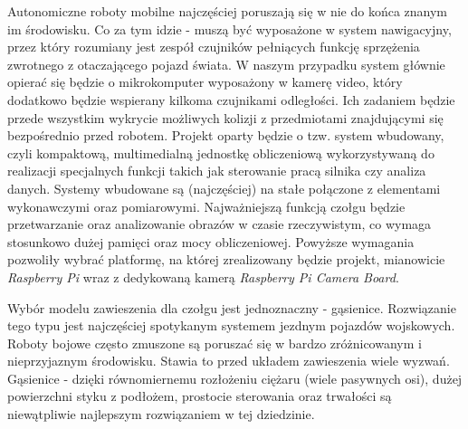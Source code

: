 Autonomiczne roboty mobilne najczęściej poruszają się w nie do końca znanym im środowisku. Co za tym idzie - muszą być wyposażone w system nawigacyjny, przez który rozumiany jest zespół czujników pełniących funkcję sprzężenia zwrotnego z otaczającego pojazd świata. W naszym przypadku system głównie opierać się będzie o mikrokomputer wyposażony w kamerę video, który dodatkowo będzie wspierany kilkoma czujnikami odległości. Ich zadaniem będzie przede wszystkim wykrycie możliwych kolizji z przedmiotami znajdującymi się bezpośrednio przed robotem. Projekt oparty będzie o tzw. system wbudowany, czyli kompaktową, multimedialną jednostkę obliczeniową wykorzystywaną do realizacji specjalnych funkcji takich jak sterowanie pracą silnika czy analiza danych. Systemy wbudowane są (najczęściej) na stałe połączone z elementami wykonawczymi oraz pomiarowymi. Najważniejszą funkcją czołgu będzie przetwarzanie oraz analizowanie obrazów w czasie rzeczywistym, co wymaga stosunkowo dużej pamięci oraz mocy obliczeniowej. Powyższe wymagania pozwoliły wybrać platformę, na której zrealizowany będzie projekt, mianowicie \textit{Raspberry Pi} wraz z dedykowaną kamerą \textit{Raspberry Pi Camera Board}. 

Wybór modelu zawieszenia dla czołgu jest jednoznaczny - gąsienice. Rozwiązanie tego typu jest najczęściej spotykanym systemem jezdnym pojazdów wojskowych. Roboty bojowe często zmuszone są poruszać się w bardzo zróżnicowanym i nieprzyjaznym środowisku. Stawia to przed układem zawieszenia wiele wyzwań.  Gąsienice - dzięki równomiernemu rozłożeniu ciężaru (wiele pasywnych osi), dużej powierzchni styku z podłożem, prostocie sterowania oraz trwałości są niewątpliwie najlepszym rozwiązaniem w tej dziedzinie.

